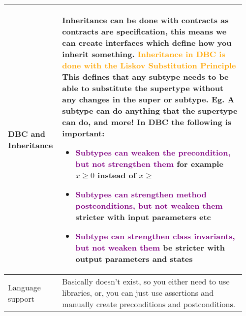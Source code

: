 \documentclass[main.tex,fontsize=8pt,paper=a4,paper=portrait,DIV=calc,]{scrartcl}
\begin{document}
\pagebreak
\begin{table}[ht!]
\begin{tabular}{|m{0.2\linewidth}|m{0.755\linewidth}|}
\hline
DBC and Inheritance & 
Inheritance can be done with contracts as contracts are \textbf{specification}, this means we can create interfaces which define how you inherit something.\newline
\textcolor{orange}{Inheritance in DBC is done with the \textbf{Liskov Substitution Principle}}\newline
\textbf{This defines that any subtype needs to be able to substitute the supertype without any changes in the super or subtype.}\newline
Eg. A subtype can do anything that the supertype can do, \textbf{and more!}\newline
In DBC the following is important: \newline
\begin{itemize}
\item \textcolor{purple}{Subtypes can weaken the precondition, but not strengthen them}\newline
  for example \(x \ge 0\) instead of \(x \geq \)
\item \textcolor{purple}{Subtypes can strengthen method postconditions, but not weaken them}\newline
  stricter with input parameters etc
\item \textcolor{purple}{Subtype can strengthen class invariants, but not weaken them}\newline
  be stricter with output parameters and states
\vspace{-3mm}
\end{itemize}\\ 
\hline
Language support & 
Basically doesn't exist, so you either need to use libraries, or, you can just use assertions and manually create preconditions and postconditions.\\
\hline

\hline

\hline

\hline

\hline

\hline

\hline

\hline

\hline

\hline

\hline

\hline

\hline

\hline
\end{tabular}
\end{table}
\end{document}
